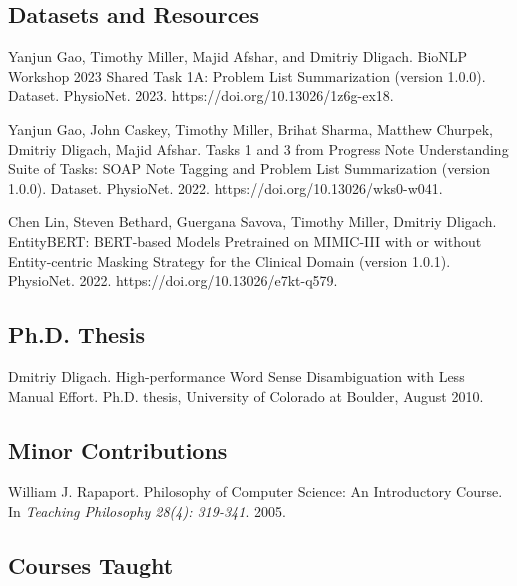 \documentclass[letterpaper]{article}
\renewenvironment{itemize}{
  \begin{list}{}{
    \setlength{\leftmargin}{1.5em}
  }
}{
  \end{list}
}
\begin{document}
\subsection*{Datasets and Resources}
\begin{itemize}
\item Yanjun Gao, Timothy Miller, Majid Afshar, and Dmitriy Dligach. BioNLP Workshop 2023 Shared Task 1A: Problem List Summarization (version 1.0.0). Dataset. PhysioNet. 2023. https://doi.org/10.13026/1z6g-ex18.
\item Yanjun Gao, John Caskey, Timothy Miller, Brihat Sharma, Matthew Churpek, Dmitriy Dligach, Majid Afshar. Tasks 1 and 3 from Progress Note Understanding Suite of Tasks: SOAP Note Tagging and Problem List Summarization (version 1.0.0). Dataset. PhysioNet. 2022. https://doi.org/10.13026/wks0-w041.
\item Chen Lin, Steven Bethard, Guergana Savova, Timothy Miller, Dmitriy Dligach. EntityBERT: BERT-based Models Pretrained on MIMIC-III with or without Entity-centric Masking Strategy for the Clinical Domain (version 1.0.1). PhysioNet. 2022. https://doi.org/10.13026/e7kt-q579.
\end{itemize}

\subsection*{Ph.D. Thesis}
\begin{itemize}
\item Dmitriy Dligach. High-performance Word Sense Disambiguation with Less Manual Effort. Ph.D. thesis, University of Colorado at Boulder, August 2010.
\end{itemize}

\subsection*{Minor Contributions}
\begin{itemize}
\item William J. Rapaport. Philosophy of Computer Science: An Introductory Course. In \emph {Teaching Philosophy 28(4): 319-341}. 2005.
\end{itemize}

\subsection*{Courses Taught}
\end{document}
